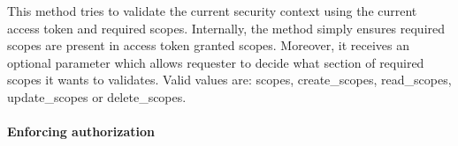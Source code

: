 \documentclass[letterpaper,10pt,english]{sphinxmanual}
\begin{document}
\begin{fulllineitems}
\begin{fulllineitems}
\label{features/oauth2/technical_summary:fantastico.oauth2.security_context.SecurityContext.validate_context}
This method tries to validate the current security context using the current access token and required scopes.
Internally, the method simply ensures required scopes are present in access token granted scopes. Moreover, it receives
an optional parameter which allows requester to decide what section of required scopes it wants to validates. Valid
values are: scopes, create\_scopes, read\_scopes, update\_scopes or delete\_scopes.

\end{fulllineitems}


\end{fulllineitems}



\paragraph{Enforcing authorization}
\label{features/oauth2/technical_summary:enforcing-authorization}
\end{document}

